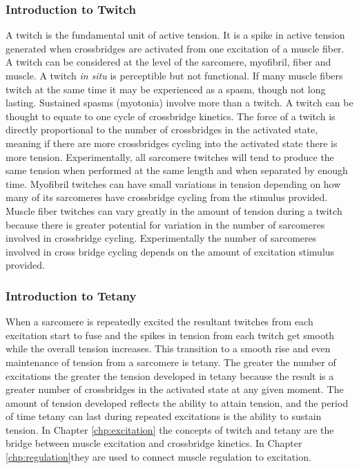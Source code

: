 \subsubsection{Introduction to Twitch}
A twitch is the fundamental unit of active tension. It is a spike in active tension generated when crossbridges are activated from one excitation of a muscle fiber. A twitch can be considered at the level of the sarcomere, myofibril, fiber and muscle. A twitch \textit{in situ} is perceptible but not functional. If many muscle fibers twitch at the same time it may be experienced as a spasm, though not long lasting. Sustained spasms (myotonia) involve more than a twitch. A twitch can be thought to equate to one cycle of crossbridge kinetics. The force of a twitch is directly proportional to the number of crossbridges in the activated state, meaning if there are more crossbridges cycling into the activated state there is more tension. Experimentally, all sarcomere twitches will tend to produce the same tension when performed at the same length and when separated by enough time. Myofibril twitches can have small variations in tension depending on how many of its sarcomeres have crossbridge cycling from the stimulus provided. Muscle fiber twitches can vary greatly in the amount of tension during a twitch because there is greater potential for variation in the number of sarcomeres involved in crossbridge cycling. Experimentally the number of sarcomeres involved in cross bridge cycling depends on the amount of excitation stimulus provided. 

\subsubsection{Introduction to Tetany}
When a sarcomere is repeatedly excited the resultant twitches from each excitation start to fuse and the spikes in tension from each twitch get smooth while the overall tension increases. This transition to a smooth rise and even maintenance of tension from a sarcomere is tetany. The greater the number of excitations the greater the tension developed in tetany because the result is a greater number of crossbridges in the activated state at any given moment. The amount of tension developed reflects the ability to attain tension, and the period of time tetany can last during repeated excitations is the ability to sustain tension.
In Chapter \ref{chp:excitation} the concepts of twitch and tetany are the bridge between muscle excitation and crossbridge kinetics. In Chapter \ref{chp:regulation}they are used to connect muscle regulation to excitation. 

